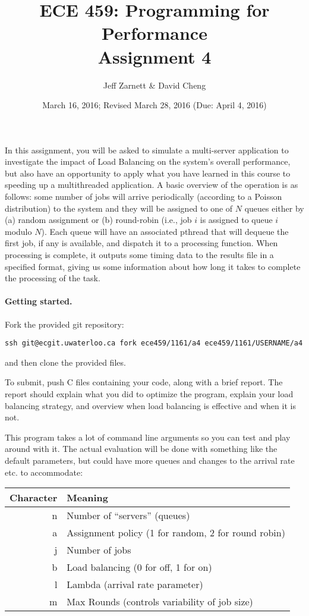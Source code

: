 \documentclass[letterpaper,10pt]{article}
\title{\bf ECE 459: Programming for Performance\\Assignment 4}
\author{Jeff Zarnett \& David Cheng}
\date{March 16, 2016; Revised March 28, 2016 (Due: April 4, 2016)}
\begin{document}
\maketitle

In this assignment, you will be asked to simulate a multi-server application to investigate the impact of Load Balancing on the system's overall performance, but also have an opportunity to apply what you have learned in this course to speeding up a multithreaded application. A basic overview of the operation is as follows: some number of jobs will arrive periodically (according to a Poisson distribution) to the system and they will be assigned to one of $N$ queues either by (a) random assignment or (b) round-robin (i.e., job $i$ is assigned to queue $i$ modulo $N$). Each queue will have an associated pthread that will dequeue the first job, if any is available, and dispatch it to a processing function. When processing is complete, it outputs some timing data to the results file in a specified format, giving us some information about how long it takes to complete the processing of the task.


\paragraph{Getting started.} Fork the provided git repository:
\begin{center}
{\tt ssh git@ecgit.uwaterloo.ca fork ece459/1161/a4 ece459/1161/USERNAME/a4}
\end{center}
\noindent and then clone the provided files.

To submit, push C files containing your code, along with a brief report. The report should explain what you did to optimize the program, explain your load balancing strategy, and overview when load balancing is effective and when it is not.

This program takes a lot of command line arguments so you can test and play around with it. The actual evaluation will be done with something like the default parameters, but could have more queues and changes to the arrival rate etc. to accommodate:

\begin{center}
	\begin{tabular}{r|l}
	\textbf{Character} & \textbf{Meaning} \\ \hline
	n & Number of ``servers'' (queues) \\
	a & Assignment policy (1 for random, 2 for round robin) \\
	j & Number of jobs \\
	b & Load balancing (0 for off, 1 for on) \\
	l & Lambda (arrival rate parameter) \\
	m & Max Rounds (controls variability of job size) \\
	\end{tabular}
\end{center}
\end{document}

